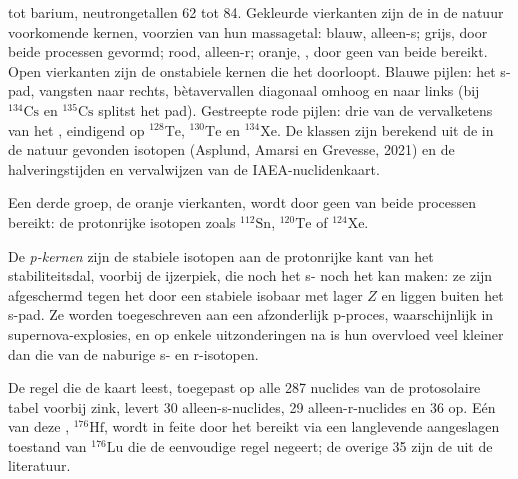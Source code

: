 \begin{omfigure}
{tot barium, neutrongetallen 62 tot 84. Gekleurde vierkanten zijn de in de natuur voorkomende kernen, voorzien
van hun massagetal: blauw, alleen-s; grijs, door beide processen gevormd; rood,
alleen-r; oranje, , door geen van beide bereikt. Open vierkanten zijn de
onstabiele kernen die het  doorloopt. Blauwe pijlen: het s-pad,
vangsten naar rechts, bètavervallen diagonaal omhoog en naar links (bij
$^{134}\mathrm{Cs}$ en $^{135}\mathrm{Cs}$ splitst het pad). Gestreepte rode
pijlen: drie van de vervalketens van het , eindigend op
$^{128}\mathrm{Te}$, $^{130}\mathrm{Te}$ en $^{134}\mathrm{Xe}$. De
klassen zijn berekend uit de in de natuur gevonden isotopen (Asplund,
Amarsi en Grevesse, 2021) en de halveringstijden en vervalwijzen van de
IAEA-nuclidenkaart.}\label{fig:b3:origin-of-elements:chart}
\end{omfigure}

Een derde groep, de oranje vierkanten, wordt door geen van beide processen bereikt: de
protonrijke isotopen zoals $^{112}\mathrm{Sn}$, $^{120}\mathrm{Te}$
of $^{124}\mathrm{Xe}$.

\begin{definition}[p-kernen]\label{def:b3:origin-of-elements:p-process}
De \emph{p-kernen} zijn de stabiele isotopen aan de
protonrijke kant van het stabiliteitsdal, voorbij de ijzerpiek, die
noch het s- noch het  kan maken: ze zijn afgeschermd tegen het 
door een stabiele isobaar met lager $Z$ en liggen buiten het s-pad. Ze
worden toegeschreven aan een afzonderlijk p-proces, waarschijnlijk in supernova-explosies, en
op enkele uitzonderingen na is hun overvloed veel kleiner dan die van de
naburige s- en r-isotopen.
\end{definition}

De regel die de kaart leest, toegepast op alle 287 nuclides van de
protosolaire tabel voorbij zink, levert 30 alleen-s-nuclides, 29 alleen-r-nuclides
en 36  op. Eén van deze , $^{176}\mathrm{Hf}$, wordt in feite
door het  bereikt via een langlevende aangeslagen toestand van
$^{176}\mathrm{Lu}$ die de eenvoudige regel negeert; de overige 35 zijn de 
uit de literatuur.

